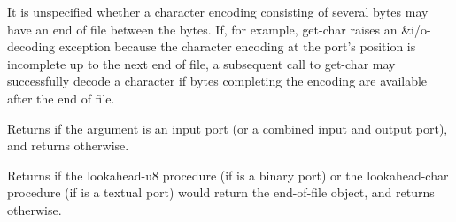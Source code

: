 It is unspecified whether a character encoding consisting of several
bytes may have an end of file between the bytes.  If, for example,
{\cf get-char} raises an {\cf\&i/o-decoding} exception because the
character encoding at the port's position is incomplete up to the next
end of file, a subsequent call to {\cf get-char} may successfully
decode a character if bytes completing the encoding are available
after the end of file.

\begin{entry}{%
}

Returns \schtrue{} if the argument is an input port (or a combined input
and output port), and returns \schfalse{} otherwise.
\end{entry}

\begin{entry}{%
}
   
Returns \schtrue{}
if the {\cf lookahead-u8} procedure (if  is a binary port)
or the {\cf lookahead-char} procedure (if  is a textual port)
would return
the end-of-file object, and returns \schfalse{} otherwise.
\end{entry}

